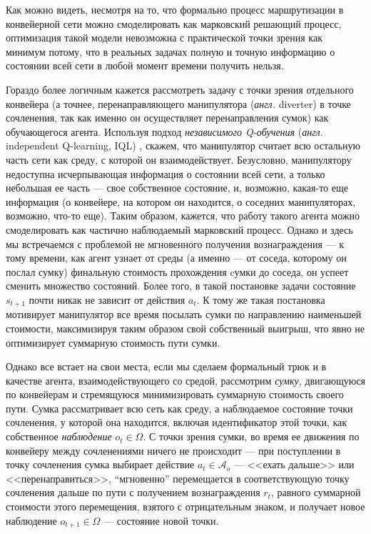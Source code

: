 \documentclass[specification,annotation,times]{itmo-student-thesis}
\theoremstyle{definition}
\begin{document}
Как можно видеть, несмотря на то, что формально процесс маршрутизации в
конвейерной сети можно смоделировать как марковский решающий процесс,
оптимизация такой модели невозможна с практической точки зрения как минимум
потому, что в реальных задачах полную и точную информацию о состоянии всей сети
в любой момент времени получить нельзя.

Гораздо более логичным кажется рассмотреть задачу с точки зрения отдельного
конвейера (а точнее, перенаправляющего манипулятора (\textit{англ.} diverter) в
точке сочленения, так как именно он осуществляет перенаправления сумок) как
обучающегося агента. Используя подход \textit{независимого Q-обучения}
(\textit{англ.} independent Q-learning, IQL) \cite{tan1993multi},
скажем, что манипулятор считает всю остальную часть сети как среду, с которой
он взаимодействует. Безусловно, манипулятору недоступна исчерпывающая
информация о состоянии всей сети, а только небольшая ее часть --- свое
собственное состояние, и, возможно, какая-то еще информация (о конвейере, на
котором он находится, о соседних манипуляторах, возможно, что-то еще). Таким
образом, кажется, что работу такого агента можно смоделировать как частично
наблюдаемый марковский процесс. Однако и здесь мы встречаемся с проблемой не
мгновенного получения вознаграждения --- к тому времени, как агент узнает от
среды (а именно --- от соседа, которому он послал сумку) финальную стоимость
прохождения cумки до соседа, он успеет сменить множество состояний. Более того,
в такой постановке задачи состояние $s_{t+1}$ почти никак не зависит от действия
$a_t$. К тому же такая постановка мотивирует манипулятор все время посылать
сумки по направлению наименьшей стоимости, максимизируя таким образом свой
собственный выигрыш, что явно не оптимизирует суммарную стоимость пути сумки.

Однако все встает на свои места, если мы сделаем формальный трюк и в качестве
агента, взаимодействующего со средой, рассмотрим \textit{сумку}, двигающуюся по
конвейерам и стремящуюся минимизировать суммарную стоимость своего пути. Сумка
рассматривает всю сеть как среду, а наблюдаемое состояние точки сочленения, у
которой она находится, включая идентификатор этой точки, как собственное
\textit{наблюдение}  $o_t \in \Omega$. С точки зрения сумки, во время
ее движения по конвейеру между сочленениями ничего не происходит --- при
поступлении в точку сочленения сумка выбирает действие $a_t \in \mathcal{A}_o$
--- <<ехать дальше>> или <<перенаправиться>>, \enquote{мгновенно} перемещается в
соответствующую точку сочленения дальше по пути с получением вознаграждения $r_t$,
равного суммарной стоимости этого перемещения, взятого с отрицательным знаком, и
получает новое наблюдение $o_{t+1} \in \Omega$ --- состояние новой точки.
\end{document}
